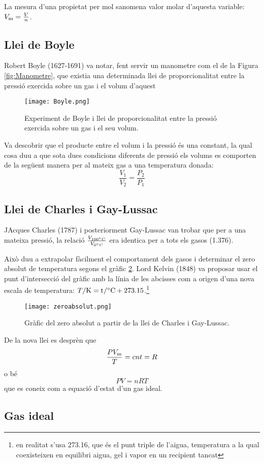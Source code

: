 La mesura d'una propietat per mol sanomena valor molar d'aquesta variable: $V_{\rm m} = \frac{V}{n}$. 
\subsection{Llei de Boyle}

Robert Boyle (1627-1691) va notar, fent servir un manometre com el de la Figura \ref{fig:Manometre}, que existia una determinada llei de proporcionalitat entre la pressió exercida sobre un gas i el volum d'aquest
\begin{figure}[h]
\centering
\texttt{[image: Boyle.png]}
\caption{Experiment de Boyle i llei de proporcionalitat entre la pressió exercida sobre un gas i el seu volum.}
\label{fig:Boyle}
\end{figure}
Va descobrir que el producte entre el volum i la pressió és una constant, la qual cosa duu a que sota dues condicions diferents de pressió els volums es comporten de la següent manera per al mateix gas a una temperatura donada:
\[
\frac{V_1}{V_2}=\frac{P_2}{P_1}
\]


\subsection{Llei de Charles i Gay-Lussac}

JAcques Charles (1787) i posteriorment Gay-Lussac van trobar que per a una mateixa pressió, la relació $\frac{V_{100 \degree C}}{V_{0 \degree C}}$ era identica per a tots els gasos (1.376).

Això duu a extrapolar fàcilment el comportament dels gasos i determinar el zero absolut de temperatura segons el gràfic \ref{fig:zeroabsolut}. Lord Kelvin (1848) va proposar usar el punt d'intersecció del gràfic amb la línia de les abcisses com a origen d'una nova escala de temperatura: $T/\rm{K} = t/\degree \rm{C} + 273.15$.\footnote{en realitat s'usa 273.16, que és el punt triple de l'aigua, temperatura a la qual coexisteixen en equilibri aigua, gel i vapor en un recipient tancat}
\begin{figure}[h]
\centering
\texttt{[image: zeroabsolut.png]}
\caption{Gràfic del zero absolut a partir de la llei de Charles i Gay-Lussac.}
\label{fig:zeroabsolut}
\end{figure}

De la nova llei es desprèn que 
\[\frac{P V_{\rm m}}{T}= cnt = R\]
o bé
\[P V = n R T\]
que es coneix com a equació d'estat d'un gas ideal.

\subsection{Gas ideal}

